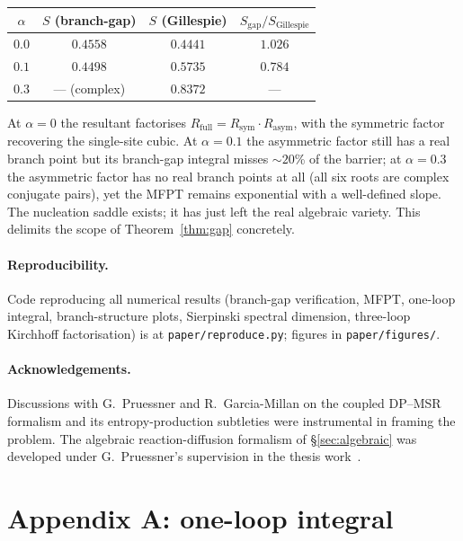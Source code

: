 \documentclass[11pt,a4paper]{article}
\theoremstyle{plain}
\begin{document}
\begin{center}\small
\begin{tabular}{@{}cccc@{}}\toprule
$\alpha$ & $S$ (branch-gap) & $S$ (Gillespie) & $S_{\mathrm{gap}}/S_{\mathrm{Gillespie}}$ \\ \midrule
$0.0$ & $0.4558$ & $0.4441$ & $1.026$ \\
$0.1$ & $0.4498$ & $0.5735$ & $0.784$ \\
$0.3$ & --- (complex) & $0.8372$ & --- \\
\bottomrule\end{tabular}
\end{center}
At $\alpha = 0$ the resultant factorises $R_\text{full} =
R_\text{sym} \cdot R_\text{asym}$, with the symmetric factor
recovering the single-site cubic.  At $\alpha = 0.1$ the
asymmetric factor still has a real branch point but its
branch-gap integral misses $\sim 20$\% of the barrier; at
$\alpha = 0.3$ the asymmetric factor has no real branch points at
all (all six roots are complex conjugate pairs), yet the MFPT
remains exponential with a well-defined slope.  The nucleation
saddle exists; it has just left the real algebraic variety.
This delimits the scope of Theorem~\ref{thm:gap} concretely.

\paragraph{Reproducibility.}
Code reproducing all numerical results (branch-gap verification,
MFPT, one-loop integral, branch-structure plots, Sierpinski
spectral dimension, three-loop Kirchhoff factorisation) is at
\texttt{paper/reproduce.py}; figures in \texttt{paper/figures/}.

\paragraph{Acknowledgements.}
Discussions with G.~Pruessner and R.~Garcia-Millan on the coupled
DP--MSR formalism and its entropy-production subtleties were
instrumental in framing the problem.  The algebraic
reaction-diffusion formalism of \S\ref{sec:algebraic} was
developed under G.~Pruessner's supervision in the thesis
work~\cite{Amarteifio2019Thesis}.

\appendix

\section*{Appendix A: one-loop integral}
\end{document}
